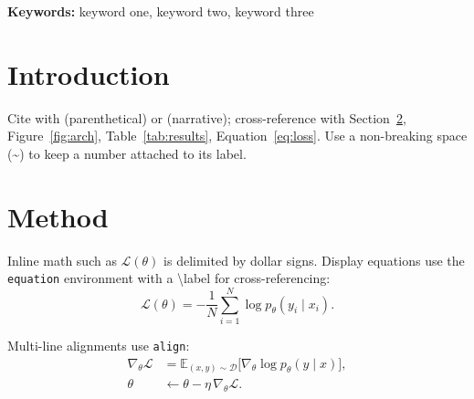 \maketitle

\begin{abstract}
Abstract paragraph (150--250 words): state the problem, the approach, the key results, and the main contribution.
\end{abstract}

\noindent\textbf{Keywords:} keyword one, keyword two, keyword three

\section{Introduction}
\label{sec:intro}

Cite with \citep{key2024} (parenthetical) or \citet{key2024} (narrative); cross-reference with Section~\ref{sec:method}, Figure~\ref{fig:arch}, Table~\ref{tab:results}, Equation~\eqref{eq:loss}. Use a non-breaking space (\textasciitilde{}) to keep a number attached to its label.

\section{Method}
\label{sec:method}

Inline math such as $\mathcal{L}(\theta)$ is delimited by dollar signs. Display equations use the \texttt{equation} environment with a \textbackslash label for cross-referencing:
\begin{equation}
  \label{eq:loss}
  \mathcal{L}(\theta) = -\frac{1}{N}\sum_{i=1}^{N} \log p_\theta(y_i \mid x_i).
\end{equation}

Multi-line alignments use \texttt{align}:
\begin{align}
  \nabla_\theta \mathcal{L} &= \mathbb{E}_{(x,y)\sim\mathcal{D}}\bigl[\nabla_\theta \log p_\theta(y\mid x)\bigr], \label{eq:grad}\\
  \theta &\leftarrow \theta - \eta\, \nabla_\theta \mathcal{L}. \label{eq:update}
\end{align}


